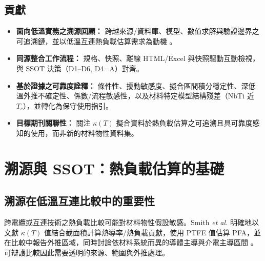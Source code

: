 \documentclass[11pt,a4paper]{article}
\begin{document}
\subsection{貢獻}
\begin{itemize}[leftmargin=*]
\item \textbf{面向低溫實務之溯源回顧：} 跨越來源/資料庫、模型、數值求解與驗證邊界之可追溯鏈，並以低溫互連熱負載估算需求為動機 \cite{smith2024,raicu2025}。
\item \textbf{同源整合工作流程：} 規格、快照、離線 HTML/Excel 與快照驅動互動檢視，與 SSOT 決策（D1--D6, D4=A）對齊。
\item \textbf{基於證據之可靠度詮釋：} 條件性、擾動敏感度、擬合區間積分穩定性、深低溫外推不確定性、係數/流程敏感性，以及材料特定模型結構殘差（NbTi 近 $T_c$），並轉化為保守使用指引。
\item \textbf{目標期刊關聯性：} 關注 $\kappa(T)$ 擬合資料於熱負載估算之可追溯且具可靠度感知的使用，而非新的材料物性資料集。
\end{itemize}

\section{溯源與 SSOT：熱負載估算的基礎}
\subsection{溯源在低溫互連比較中的重要性}
跨電纜或互連技術之熱負載比較可能對材料物性假設敏感。Smith \textit{et al.} 明確地以文獻 $\kappa(T)$ 值結合截面積計算熱導率/熱負載貢獻，使用 PTFE 值估算 PFA，並在比較中報告外推區域，同時討論依材料系統而異的導體主導與介電主導區間 \cite{smith2024}。可辯護比較因此需要透明的來源、範圍與外推處理。
\end{document}
